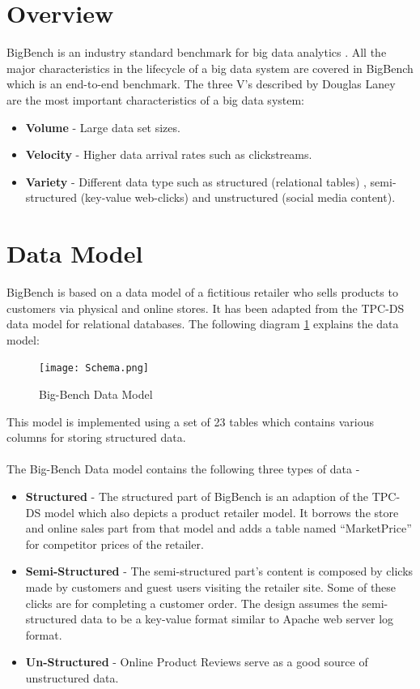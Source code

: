 \documentclass[12pt]{book}
\begin{document}
\section{Overview}
BigBench is an industry standard benchmark for big data analytics \cite{ghazal}. All the major characteristics in the lifecycle of a big data 
system are covered in BigBench which is an end-to-end benchmark. The three V's described by Douglas Laney \cite{doug} are the most important
characteristics of a big data system:
\begin{itemize}
 \item \textbf{Volume} - Large data set sizes.
 \item \textbf{Velocity} - Higher data arrival rates such as clickstreams.
 \item \textbf{Variety} - Different data type such as structured (relational tables) , semi-structured (key-value web-clicks) 
  and unstructured (social media content).
\end{itemize}
\section{Data Model}
BigBench is based on a data model of a fictitious retailer who sells products to customers via physical and online stores.
It has been adapted from the TPC-DS data model for relational databases.
The following diagram \ref{schema} explains the data model:
\begin{figure}[hb]
 \centering
 \texttt{[image: Schema.png]}
 \caption{Big-Bench Data Model \label{schema}}
\end{figure}
\newpage
\noindent
This model is implemented using a set of 23 tables which contains various columns for storing structured data.
\\\noindent
\\\noindent
The Big-Bench Data model contains the following three types of data -
\begin{itemize}
 \item \textbf{Structured} - The structured part of BigBench is an adaption of the TPC-DS model which also depicts a product retailer model.
 It borrows the store and online sales part from that model and adds a table named ``MarketPrice'' for competitor prices of the retailer.
 \item \textbf{Semi-Structured} - The semi-structured part's content is composed by clicks made by customers and guest users visiting 
 the retailer site. Some of these clicks are for completing a customer order. The design assumes the semi-structured data to be a key-value 
 format similar to Apache web server log format.
 \item \textbf{Un-Structured} - Online Product Reviews serve as a good source of unstructured data.
\end{itemize}
\end{document}
